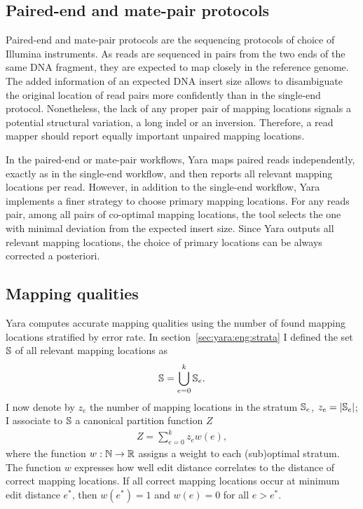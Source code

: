 

\subsection{Paired-end and mate-pair protocols}
\label{sec:yara:eng:pairs}
Paired-end and mate-pair protocols are the sequencing protocols of choice of Illumina instruments.
As reads are sequenced in pairs from the two ends of the same DNA fragment, they are expected to map closely in the reference genome.
The added information of an expected DNA insert size allows to disambiguate the original location of read pairs more confidently than in the single-end protocol.
Nonetheless, the lack of any proper pair of mapping locations signals a potential structural variation, \eg a long indel or an inversion.
Therefore, a read mapper should report equally important unpaired mapping locations.

In the paired-end or mate-pair workflows, Yara maps paired reads independently, exactly as in the single-end workflow, and then reports all relevant mapping locations per read.
However, in addition to the single-end workflow, Yara implements a finer strategy to choose primary mapping locations.
For any reads pair, among all pairs of co-optimal mapping locations, the tool selects the one with minimal deviation from the expected insert size.
Since Yara outputs all relevant mapping locations, the choice of primary locations can be always corrected a posteriori.

\subsection{Mapping qualities}
\label{sec:yara:eng:qualities}
Yara computes accurate mapping qualities using the number of found mapping locations stratified by error rate.
In section~\ref{sec:yara:eng:strata} I defined the set $\mathbb{S}$ of all relevant mapping locations as
\begin{eqnarray}
\mathbb{S} = \bigcup_{e=0}^{k} \mathbb{S}_e.
\end{eqnarray}
I now denote by $z_e$ the number of mapping locations in the stratum $\mathbb{S}_e$, \ie $z_e=|\mathbb{S}_e|$;
I associate to $\mathbb{S}$ a canonical partition function $Z$
\begin{eqnarray}
\label{eq:yara:mqual:partition}
Z = \sum_{e=0}^{k} z_e w(e),
\end{eqnarray}
where the function $w : \mathbb {N} \rightarrow \mathbb {R}$ assigns a weight to each (sub)optimal stratum.
The function $w$ expresses how well edit distance correlates to the distance of correct mapping locations.
If all correct mapping locations occur at minimum edit distance $e^*$, then $w(e^*) = 1$ and $w(e) = 0$ for all $e > e^*$.

